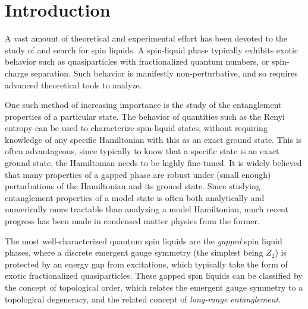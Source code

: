 \documentclass[11pt]{iopart}
\begin{document}
\section{Introduction}
\label{sec:introduction}



A vast amount of theoretical and experimental effort has been devoted to the study of and search for spin liquids. A spin-liquid phase typically exhibits exotic behavior such as quasiparticles 
with fractionalized quantum numbers, or spin-charge separation. Such behavior is manifestly non-perturbative, and so requires advanced theoretical tools to analyze. 

One such method of increasing importance is the study of the entanglement properties of a particular state.  The behavior of quantities such as the Renyi entropy can be used to characterize spin-liquid states, without requiring knowledge of any specific Hamiltonian with this as an exact ground state.  This is often advantageous, since typically to know that a specific state is an exact ground state, the Hamiltonian needs to be highly fine-tuned. It is widely believed that many properties of a gapped phase are robust under (small enough) perturbations of the Hamiltonian and its ground state. Since studying entanglement properties of a model state is often both analytically and numerically more tractable than analyzing a model Hamiltonian, much recent progress has been made in condensed matter physics from the former.

 The most well-characterized quantum spin liquids are the {\it gapped} spin liquid phases, where a discrete emergent gauge symmetry (the simplest being $Z_2$) is protected by an energy gap from excitations, which typically take the form of exotic fractionalized quasiparticles.  These gapped spin liquids can be classified by the concept of topological order, which relates the emergent gauge symmetry to a topological degeneracy, and the related concept of {\it long-range entanglement}.  
\end{document}
